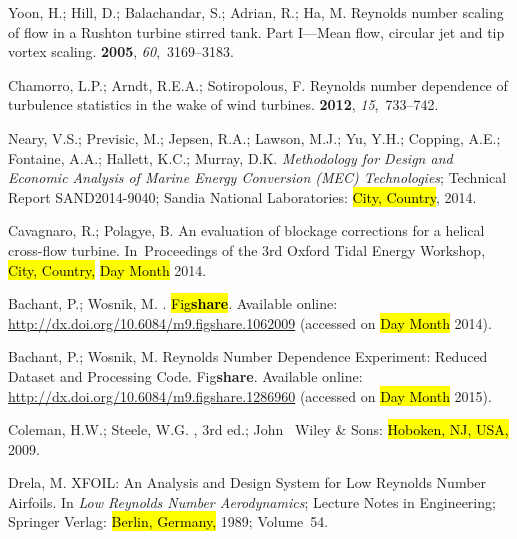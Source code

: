 \documentclass[energies,article,accept,moreauthors,pdftex,10pt,a4paper]{mdpi}
\theoremstyle{mdpi}
\newcounter{ex}
\newcounter{re}
\begin{document}
\begin{thebibliography}{999}
Yoon, H.; Hill, D.; Balachandar, S.; Adrian, R.; Ha, M.
\newblock Reynolds number scaling of flow in a Rushton turbine stirred tank.
 Part I—Mean flow, circular jet and tip vortex scaling.
 {\bf 2005}, {\em 60},~3169--3183.

Chamorro, L.P.; Arndt, R.E.A.; Sotiropolous, F.
\newblock Reynolds number dependence of turbulence statistics in the wake of
 wind turbines.
 {\bf 2012}, {\em 15},~733--742.

Neary, V.S.; Previsic, M.; Jepsen, R.A.; Lawson, M.J.; Yu, Y.H.; Copping, A.E.;
 Fontaine, A.A.; Hallett, K.C.; Murray, D.K.
\newblock \emph{Methodology for Design and Economic Analysis of Marine Energy
 Conversion ({MEC}) Technologies};
\newblock Technical Report SAND2014-9040; Sandia National Laboratories: \hl{City, Country}, 2014.

Cavagnaro, R.; Polagye, B.
\newblock An evaluation of blockage corrections for a helical cross-flow
 turbine.
\newblock In~Proceedings of the 3rd Oxford Tidal Energy Workshop, \hl{City, Country,} \hl{Day Month} 2014.

Bachant, P.; Wosnik, M.
.
\newblock \hl {Fig\textbf{share}}. 
Available online: 
 \url{http://dx.doi.org/10.6084/m9.figshare.1062009} (accessed on \hl{Day Month} 2014).

Bachant, P.; Wosnik, M.
 {R}eynolds Number Dependence Experiment: Reduced Dataset
 and Processing Code.
\newblock Fig\textbf{share}. Available online: 
 \url{http://dx.doi.org/10.6084/m9.figshare.1286960} (accessed on \hl{Day Month} 2015).

Coleman, H.W.; Steele, W.G.
, 3rd ed.; John~ Wiley \& Sons: \hl{ Hoboken, NJ, USA,} 2009.

Drela, M.
\newblock XFOIL: An Analysis and Design System for Low Reynolds Number
 Airfoils. In {\em Low Reynolds Number Aerodynamics}; Lecture Notes in Engineering; Springer Verlag: \hl{Berlin, Germany,} 1989;
 Volume~54.


\end{thebibliography}
\end{document}

